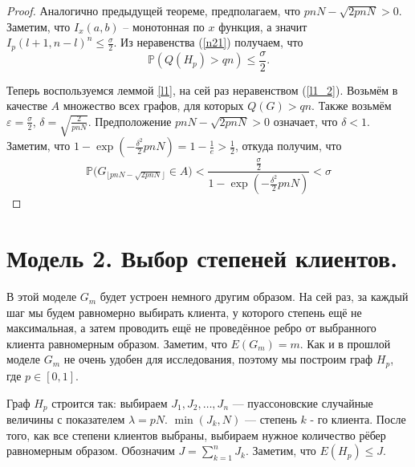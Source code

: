 \documentclass[10pt]{article}
\newcommand{\PRob}{\mathbb P}
\newcommand{\leqs}{\leqslant}
\newcommand{\eps}{\varepsilon}
\theoremstyle{named}
\begin{document}
\begin{proof}
Аналогично предыдущей теореме, предполагаем, что $pnN - \sqrt{2pnN} > 0$.
Заметим, что $I_x(a,b)$ -- монотонная по $x$ функция, а значит $I_p(l+1, n-l)^n \leqs \frac\sigma{2}$. 
Из неравенства (\ref{n21}) получаем, что
\begin{equation}
\PRob(Q(H_p) > qn) \leqs \frac\sigma{2}.
\end{equation}

Теперь воспользуемся леммой \ref{l1}, на сей раз неравенством (\ref{l1_2}).
Возьмём в качестве $A$ множество всех графов, для которых $Q(G) > qn$.
Также возьмём $\eps = \frac\sigma{2}$, $\delta = \sqrt{\frac{2}{pnN}}$.
Предположение $pnN - \sqrt{2pnN} > 0$ означает, что $\delta < 1$.
Заметим, что $1 - \exp\left(-\frac{\delta^2}{2}pnN\right) = 1 - \frac{1}{e} > \frac{1}{2}$, откуда получим, что
\begin{equation}
\PRob\big(G_{\lfloor pnN - \sqrt{2pnN} \rfloor} \in A\big) 
	< 
\frac{\frac\sigma{2}}{1 - \exp\left(-\frac{\delta^2}{2}pnN\right)}
	<
\sigma
\end{equation}
\end{proof}

\section{Модель 2. Выбор степеней клиентов.}
В этой моделе $G_m$ будет устроен немного другим образом. На сей раз, за каждый шаг мы будем равномерно выбирать клиента, 
у которого степень ещё не максимальная, а затем проводить ещё не проведённое ребро от выбранного клиента равномерным образом.
Заметим, что $E(G_m) = m$. Как и в прошлой моделе $G_m$ не очень удобен для исследования, поэтому мы построим граф $H_p$, где $p \in [0,1]$.

Граф $H_p$ строится так: выбираем $J_1, J_2, \dots, J_n$ --- пуассоновские случайные величины с показателем $\lambda = pN$.
$\min(J_k, N)$ --- степень $k$ - го клиента. После того, как все степени клиентов выбраны, 
выбираем нужное количество рёбер равномерным образом. Обозначим $J = \sum\limits_{k=1}^n J_k$. Заметим, что $E(H_p) \leqs J$.
\end{document}
